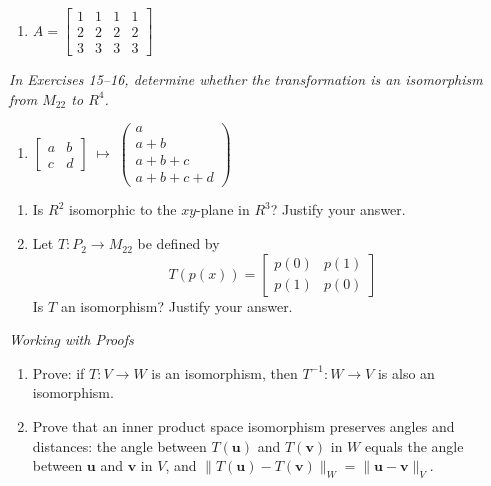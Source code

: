 \documentclass{article}
\begin{document}
\begin{enumerate}
  \item[13.] $A = \begin{bmatrix}1&1&1&1\\2&2&2&2\\3&3&3&3\end{bmatrix}$

\end{enumerate}

\noindent\textit{In Exercises 15--16, determine whether the transformation is an isomorphism
from $M_{22}$ to $R^4$.}

\begin{enumerate}
  \item[15.] $\begin{bmatrix}a&b\\c&d\end{bmatrix} \;\longmapsto\;
        \begin{pmatrix}a \\ a+b \\ a+b+c \\ a+b+c+d\end{pmatrix}$

\end{enumerate}

\begin{enumerate}
  \item[17.] Is $R^2$ isomorphic to the $xy$-plane in $R^3$? Justify your answer.

  \item[19.] Let $T : P_2 \to M_{22}$ be defined by
        \[
          T(p(x)) = \begin{bmatrix}p(0) & p(1)\\p(1) & p(0)\end{bmatrix}
        \]
        Is $T$ an isomorphism? Justify your answer.

\end{enumerate}

\noindent\textit{Working with Proofs}

\begin{enumerate}
  \item[22.] Prove: if $T : V \to W$ is an isomorphism, then $T^{-1} : W \to V$ is also
        an isomorphism.

  \item[25.] Prove that an inner product space isomorphism preserves angles and
        distances: the angle between $T(\mathbf{u})$ and $T(\mathbf{v})$ in $W$ equals
        the angle between $\mathbf{u}$ and $\mathbf{v}$ in $V$, and
        $\|T(\mathbf{u}) - T(\mathbf{v})\|_W = \|\mathbf{u} - \mathbf{v}\|_V$.

\end{enumerate}
\end{document}
